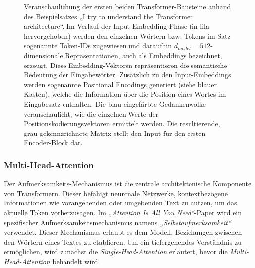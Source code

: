 \begin{figure}
	\centering
	
	\caption{Veranschaulichung der ersten beiden Transformer-Bausteine anhand des Beispielsatzes „I try to understand the Transformer architecture“. Im Verlauf der Input-Embedding-Phase (in lila hervorgehoben) werden den einzelnen Wörtern bzw. Tokens im Satz sogenannte Token-IDs zugewiesen und daraufhin $d_{model}=512$-dimensionale Repräsentationen, auch als Embeddings bezeichnet, erzeugt. Diese Embedding-Vektoren repräsentieren die semantische Bedeutung der Eingabewörter. Zusätzlich zu den Input-Embeddings werden sogenannte Positional Encodings generiert (siehe blauer Kasten), welche die Information über die Position eines Wortes im Eingabesatz enthalten. Die blau eingefärbte Gedankenwolke veranschaulicht, wie die einzelnen Werte der Positionskodierungsvektoren ermittelt werden. Die resultierende, grau gekennzeichnete Matrix stellt den Input für den ersten Encoder-Block dar.}
	\label{Abb:TransformerVisualization}
\end{figure}


\subsubsection*{Multi-Head-Attention}

Der Aufmerksamkeits-Mechanismus ist die zentrale architektonische Komponente von Transformern. Dieser befähigt neuronale Netzwerke, kontextbezogene Informationen wie vorangehenden oder umgebenden Text zu nutzen, um das aktuelle Token vorherzusagen. \cite{Formal_Algorithms_for_Transformers_DeepMind} Im \emph{„Attention Is All You Need“}-Paper wird ein spezifischer Aufmerksamkeitsmechanismus namens \emph{„Selbstaufmerksamkeit“} verwendet. Dieser Mechanismus erlaubt es dem Modell, Beziehungen zwischen den Wörtern eines Textes zu etablieren. Um ein tiefergehendes Verständnis zu ermöglichen, wird zunächst die \emph{Single-Head-Attention} erläutert, bevor die \emph{Multi-Head-Attention} behandelt wird.

